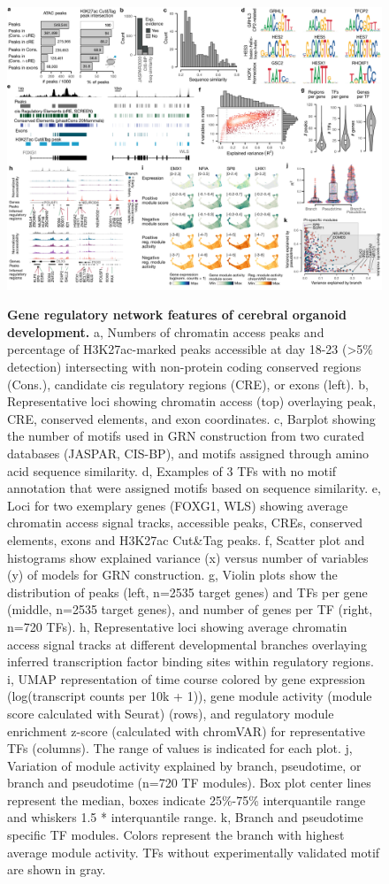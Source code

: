 \begin{figure}[h!]
    \centering
	\includegraphics[width=\textwidth]{figures/pando/Figure_S5}
    \label{fig:regS5}
    \caption{\textbf{Gene regulatory network features of cerebral organoid development.} a, Numbers of chromatin access peaks and percentage of H3K27ac-marked peaks accessible at day 18-23 (>5\% detection) intersecting with non-protein coding conserved regions (Cons.), candidate cis regulatory regions (CRE), or exons (left). b, Representative loci showing chromatin access (top) overlaying peak, CRE, conserved elements, and exon coordinates. c, Barplot showing the number of motifs used in GRN construction from two curated databases (JASPAR, CIS-BP), and motifs assigned through amino acid sequence similarity. d, Examples of 3 TFs with no motif annotation that were assigned motifs based on sequence similarity. e, Loci for two exemplary genes (FOXG1, WLS) showing average chromatin access signal tracks, accessible peaks, CREs, conserved elements, exons and H3K27ac Cut\&Tag peaks. f, Scatter plot and histograms show explained variance (x) versus number of variables (y) of models for GRN construction. g, Violin plots show the distribution of peaks (left, n=2535 target genes) and TFs per gene (middle, n=2535 target genes), and number of genes per TF (right, n=720 TFs). h, Representative loci showing average chromatin access signal tracks at different developmental branches overlaying inferred transcription factor binding sites within regulatory regions. i, UMAP representation of time course colored by gene expression (log(transcript counts per 10k + 1)), gene module activity (module score calculated with Seurat) (rows), and regulatory module enrichment z-score (calculated with chromVAR) for representative TFs (columns). The range of values is indicated for each plot. j, Variation of module activity explained by branch, pseudotime, or branch and pseudotime (n=720 TF modules). Box plot center lines represent the median, boxes indicate 25\%-75\% interquantile range and whiskers 1.5 * interquantile range. k, Branch and pseudotime specific TF modules. Colors represent the branch with highest average module activity. TFs without experimentally validated motif are shown in gray. }
\end{figure}


